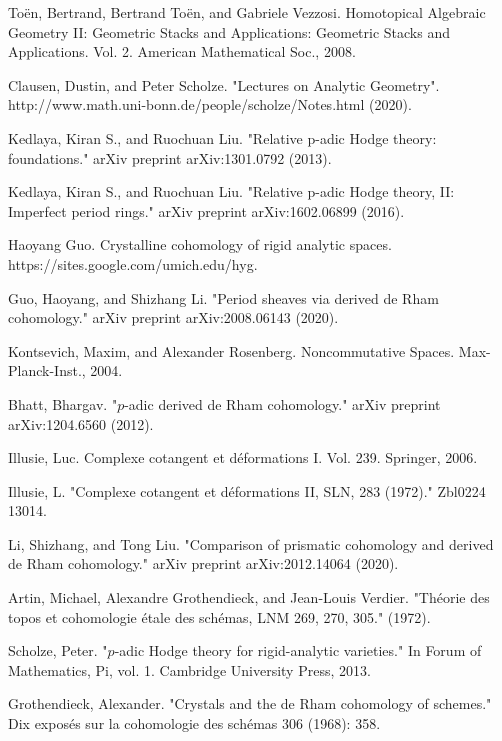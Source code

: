 \documentclass[12pt]{amsart}
\theoremstyle{definition}
\numberwithin{equation}{section}
\begin{document}
\begin{thebibliography}{10}
 To\"en, Bertrand, Bertrand To\"en, and Gabriele Vezzosi. Homotopical Algebraic Geometry II: Geometric Stacks and Applications: Geometric Stacks and Applications. Vol. 2. American Mathematical Soc., 2008.	

 Clausen, Dustin, and Peter Scholze. "Lectures on Analytic Geometry". http://www.math.uni-bonn.de/people/scholze/Notes.html (2020).

 Kedlaya, Kiran S., and Ruochuan Liu. "Relative p-adic Hodge theory: foundations." arXiv preprint arXiv:1301.0792 (2013).

 Kedlaya, Kiran S., and Ruochuan Liu. "Relative p-adic Hodge theory, II: Imperfect period rings." arXiv preprint arXiv:1602.06899 (2016).

 Haoyang Guo. Crystalline cohomology of rigid analytic spaces. https://sites.google.com/umich.edu/hyg.

 Guo, Haoyang, and Shizhang Li. "Period sheaves via derived de Rham cohomology." arXiv preprint arXiv:2008.06143 (2020).

 Kontsevich, Maxim, and Alexander Rosenberg. Noncommutative Spaces. Max-Planck-Inst., 2004.


 Bhatt, Bhargav. "$p$-adic derived de Rham cohomology." arXiv preprint arXiv:1204.6560 (2012).

 Illusie, Luc. Complexe cotangent et d\'eformations I. Vol. 239. Springer, 2006.

 Illusie, L. "Complexe cotangent et d\'eformations II, SLN, 283 (1972)." Zbl0224 13014.



 Li, Shizhang, and Tong Liu. "Comparison of prismatic cohomology and derived de Rham cohomology." arXiv preprint arXiv:2012.14064 (2020).


 Artin, Michael, Alexandre Grothendieck, and Jean-Louis Verdier. "Th\'eorie des topos et cohomologie \'etale des sch\'emas, LNM 269, 270, 305." (1972).


 Scholze, Peter. "$p$-adic Hodge theory for rigid-analytic varieties." In Forum of Mathematics, Pi, vol. 1. Cambridge University Press, 2013.

 Grothendieck, Alexander. "Crystals and the de Rham cohomology of schemes." Dix expos\'es sur la cohomologie des sch\'emas 306 (1968): 358.


\end{thebibliography}
\end{document}
